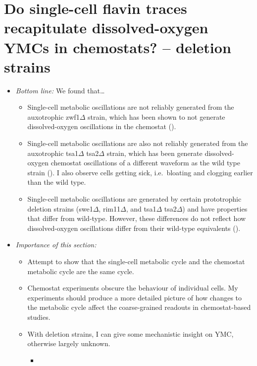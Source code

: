 \section[Deletion strains]{Do single-cell flavin traces recapitulate dissolved-oxygen YMCs in chemostats? -- deletion strains}
\label{sec:biology-deletions}

\begin{itemize}
\item \emph{Bottom line:} We found that\ldots{}
\begin{itemize}
\item Single-cell metabolic oscillations are not reliably generated from the auxotrophic zwf1$\Delta$ strain, which has been shown to not generate dissolved-oxygen oscillations in the chemostat (\textcite{tuCyclicChangesMetabolic2007}).
\item Single-cell metabolic oscillations are also not reliably generated from the auxotrophic tsa1$\Delta$ tsa2$\Delta$ strain, which has been generate dissolved-oxygen chemostat oscillations of a different waveform as the wild type strain (\textcite{caustonMetabolicCyclesYeast2015}).  I also observe cells getting sick, i.e.\ bloating and clogging earlier than the wild type.
\item Single-cell metabolic oscillations are generated by certain prototrophic deletion strains (swe1$\Delta$, rim11$\Delta$, and tsa1$\Delta$ tsa2$\Delta$) and have properties that differ from wild-type.  However, these differences do not reflect how dissolved-oxygen oscillations differ from their wild-type equivalents (\textcite{caustonMetabolicCyclesYeast2015}).
\end{itemize}
\item \emph{Importance of this section:}
\begin{itemize}
\item Attempt to show that the single-cell metabolic cycle and the chemostat metabolic cycle are the same cycle.
\item Chemostat experiments obscure the behaviour of individual cells.  My experiments should produce a more detailed picture of how changes to the metabolic cycle affect the coarse-grained readouts in chemostat-based studies.
\item With deletion strains, I can give some mechanistic insight on YMC, otherwise largely unknown.
\begin{itemize}
\item \textcite{tuCyclicChangesMetabolic2007}
\begin{itemize}

\end{itemize}
\end{itemize}
\end{itemize}
\end{itemize}
